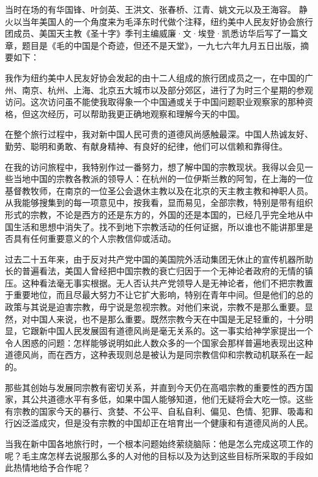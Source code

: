 \begin{maonote}
当时在场的有华国锋、叶剑英、王洪文、张春桥、江青、姚文元以及王海容。
静火以当年美国人的一个角度来为毛泽东时代做个注释，纽约美中人民友好协会旅行团成员、美国天主教《圣十字》季刊主编威廉·文·埃登·凯悉访华后写了一篇文章，题目是《毛的中国是个奇迹，但还不是天堂》，一九七六年九月五日出版，摘要如下：

我作为纽约美中人民友好协会发起的由十二人组成的旅行团成员之一，在中国的广州、南京、杭州、上海、北京五大城市以及部分郊区，进行了为时三个星期的参观访问。这次访问虽不能使我取得象一个中国通或关于中国问题职业观察家的那种资格，但这次经历，可以帮助我更正确地观察和理解今天的中国。

在整个旅行过程中，我对新中国人民可贵的道德风尚感触最深。中国人热诚友好、勤劳、聪明和勇敢、有献身精神、有良好的纪律，他们可以信赖和靠得住。

在我的访问旅程中，我特别作过一番努力，想了解中国的宗教现状。我得以会见一些当地中国的宗教各教派的领导人：在杭州的一位伊斯兰教的阿訇，在上海的一位基督教牧师，在南京的一位圣公会退休主教以及在北京的天主教主教和神职人员。从我能够搜集到的每一项意见中，按我看，显而易见，全部宗教，特别是带有组织形式的宗教，不论是西方的还是东方的，外国的还是本国的，已经几乎完全地从中国生活和思想中消失了。找不到地下宗教活动的任何证据，所以谁也不能讲那里是否具有任何重要意义的个人宗教信仰或活动。

过去二十五年来，由于反对共产党中国的美国院外活动集团无休止的宣传机器所助长的普遍看法，美国人曾经把中国宗教的衰亡归因于一个无神论者政府的无情的镇压。这种看法毫无事实根据。无人否认共产党领导人是无神论者，他们不把宗教置于重要地位，而且尽最大努力不让它扩大影响，特别在青年中间。但是他们的总的政策与其说是迫害宗教，毋宁说是忽视宗教。对他们来说，宗教不是那么重要。显然，对中国人来说，也不是那么重要。既然宗教今天在中国是无足轻重的，十分明显，它跟新中国人民发展固有道德风尚是毫无关系的。这一事实给神学家提出一个令人困惑的问题：怎样能够说明如此人数众多的一个国家会那样普遍地表现出这种道德风尚，而在西方，这种表现则总是被认为是同宗教信仰和宗教动机联系在一起的。

那些其创始与发展同宗教有密切关系，并直到今天仍在高唱宗教的重要性的西方国家，其公共道德水平有多低，如果中国人能够知道，他们无疑将会大吃一惊。这些有宗教的国家今天的暴行、贪婪、不公平、自私自利、偏见、色情、犯罪、吸毒和行凶泛滥成灾，但是没有宗教的中国却正在培育出一个健康和有道德风尚的人民。

当我在新中国各地旅行时，一个根本问题始终萦绕脑际：他是怎么完成这项工作的呢？毛主席怎样去说服那么多的人对他的目标以及为达到这些目标所采取的手段如此热情地给予合作呢？


\end{maonote}
